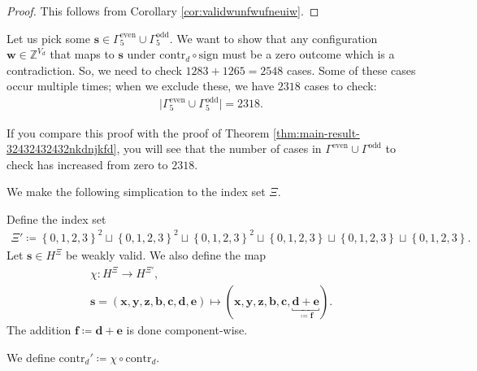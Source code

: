 \begin{proof}
    This follows from Corollary \ref{cor:validwunfwufneuiw}.
\end{proof}

Let us pick some \( \mathbf{s} \in \Gamma^{\mathrm{even}}_5 \cup \Gamma^{\mathrm{odd}}_5 \). We want to show that any configuration \( \mathbf{w} \in \mathbb{Z}^{V_d} \) that maps to \( \mathbf{s} \) under \( \mathrm{contr}_d \circ \mathrm{sign} \) must be a zero outcome which is a contradiction. So, we need to check \( 1283 + 1265 = 2548 \) cases.
Some of these cases occur multiple times; when we exclude these, we have \( 2318 \) cases to check:
\begin{align*}
    \lvert \Gamma^{\mathrm{even}}_5 \cup \Gamma^{\mathrm{odd}}_5  \rvert = 2318.
\end{align*}

\begin{remark}
    If you compare this proof with the proof of Theorem \ref{thm:main-result-32432432432nkdnjkfd}, you will see that the number of cases in \( \Gamma^{\mathrm{even}} \cup \Gamma^{\mathrm{odd}} \) to check has increased from zero to \( 2318 \).
\end{remark}

We make the following simplication to the index set \( \Xi \).

\begin{definition}
    Define the index set
    \begin{align*}
        \Xi' \coloneqq \left\{ 0,1,2,3 \right\}^2 \sqcup \left\{ 0,1,2,3 \right\}^2 \sqcup \left\{ 0,1,2,3 \right\}^2 \sqcup \left\{ 0,1,2,3 \right\} \sqcup \left\{ 0,1,2,3 \right\} \sqcup \left\{ 0,1,2,3 \right\}.
    \end{align*}
    Let \( \mathbf{s} \in H^{\Xi} \) be weakly valid. We also define the map
    \begin{gather*}
        \chi: H^\Xi \to H^{\Xi'},\\ \mathbf{s} = (\mathbf{x}, \mathbf{y}, \mathbf{z}, \mathbf{b}, \mathbf{c}, \mathbf{d}, \mathbf{e}) \mapsto (\mathbf{x}, \mathbf{y}, \mathbf{z}, \mathbf{b}, \mathbf{c}, \underbracket{\mathbf{d} + \mathbf{e}}_{\coloneqq \mathbf{f}}).
    \end{gather*}
    The addition \( \mathbf{f} \coloneqq \mathbf{d} + \mathbf{e} \) is done component-wise.
\end{definition}

\begin{definition}
    We define \( \mathrm{contr}_d' \coloneqq \chi \circ \mathrm{contr}_d \).
\end{definition}

